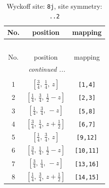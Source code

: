 \documentclass[fleqn,8pt]{jsarticle}
\begin{document}
\begin{longtable}{ccc}
\caption{Wyckoff site: {\tt 8j}, site symmetry: {\tt ..2}}
 \\
 \hline \hline
No. & position & mapping \\ \hline \endfirsthead

\multicolumn{2}{l}{\tablename\ \thetable{}} \\
 \hline \hline
No. & position & mapping \\ \hline \endhead

 \hline \hline
\multicolumn{2}{r}{\footnotesize\it continued ...} \\ \endfoot

 \hline \hline
\multicolumn{2}{r}{} \\ \endlastfoot

1 & $\left[ \frac{3}{4},\, \frac{1}{4},\, z \right]$ & {\tt [1,4]} \\ \hline
2 & $\left[ \frac{1}{4},\, \frac{3}{4},\, \frac{1}{2} - z \right]$ & {\tt [2,3]} \\ \hline
3 & $\left[ \frac{1}{4},\, \frac{3}{4},\, - z \right]$ & {\tt [5,8]} \\ \hline
4 & $\left[ \frac{3}{4},\, \frac{1}{4},\, z + \frac{1}{2} \right]$ & {\tt [6,7]} \\ \hline
5 & $\left[ \frac{1}{4},\, \frac{3}{4},\, z \right]$ & {\tt [9,12]} \\ \hline
6 & $\left[ \frac{3}{4},\, \frac{1}{4},\, \frac{1}{2} - z \right]$ & {\tt [10,11]} \\ \hline
7 & $\left[ \frac{3}{4},\, \frac{1}{4},\, - z \right]$ & {\tt [13,16]} \\ \hline
8 & $\left[ \frac{1}{4},\, \frac{3}{4},\, z + \frac{1}{2} \right]$ & {\tt [14,15]} \\
\end{longtable}
\renewcommand{\arraystretch}{1.2}
\end{document}
